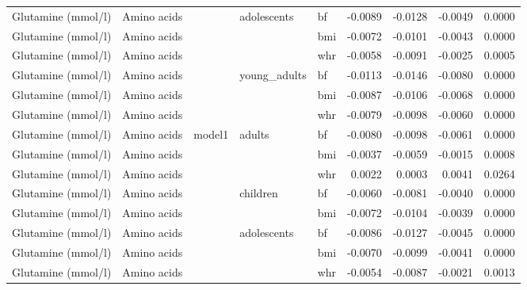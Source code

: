 \documentclass[11pt,twoside]{bristolthesis}
\begin{document}
\begin{longtable}[t]{lllllrrrr}
\cmidrule{1-2}
\cmidrule{5-9}\nopagebreak
Glutamine (mmol/l) & Amino acids &  & \multirow{-2}{*}{\raggedright\arraybackslash adolescents} & bf & -0.0089 & -0.0128 & -0.0049 & 0.0000\\
\cmidrule{1-2}
\cmidrule{4-9}\nopagebreak
Glutamine (mmol/l) & Amino acids &  &  & bmi & -0.0072 & -0.0101 & -0.0043 & 0.0000\\
\cmidrule{1-2}
\cmidrule{5-9}\nopagebreak
Glutamine (mmol/l) & Amino acids &  &  & whr & -0.0058 & -0.0091 & -0.0025 & 0.0005\\
\cmidrule{1-2}
\cmidrule{5-9}\nopagebreak
Glutamine (mmol/l) & Amino acids &  & \multirow{-3}{*}{\raggedright\arraybackslash young\_adults} & bf & -0.0113 & -0.0146 & -0.0080 & 0.0000\\
\cmidrule{1-2}
\cmidrule{4-9}\nopagebreak
Glutamine (mmol/l) & Amino acids &  &  & bmi & -0.0087 & -0.0106 & -0.0068 & 0.0000\\
\cmidrule{1-2}
\cmidrule{5-9}\nopagebreak
Glutamine (mmol/l) & Amino acids &  &  & whr & -0.0079 & -0.0098 & -0.0060 & 0.0000\\
\cmidrule{1-2}
\cmidrule{5-9}\nopagebreak
Glutamine (mmol/l) & Amino acids & \multirow{-11}{*}{\raggedright\arraybackslash model1} & \multirow{-3}{*}{\raggedright\arraybackslash adults} & bf & -0.0080 & -0.0098 & -0.0061 & 0.0000\\
\cmidrule{1-9}\pagebreak[0]
Glutamine (mmol/l) & Amino acids &  &  & bmi & -0.0037 & -0.0059 & -0.0015 & 0.0008\\
\cmidrule{1-2}
\cmidrule{5-9}\nopagebreak
Glutamine (mmol/l) & Amino acids &  &  & whr & 0.0022 & 0.0003 & 0.0041 & 0.0264\\
\cmidrule{1-2}
\cmidrule{5-9}\nopagebreak
Glutamine (mmol/l) & Amino acids &  & \multirow{-3}{*}{\raggedright\arraybackslash children} & bf & -0.0060 & -0.0081 & -0.0040 & 0.0000\\
\cmidrule{1-2}
\cmidrule{4-9}\nopagebreak
Glutamine (mmol/l) & Amino acids &  &  & bmi & -0.0072 & -0.0104 & -0.0039 & 0.0000\\
\cmidrule{1-2}
\cmidrule{5-9}\nopagebreak
Glutamine (mmol/l) & Amino acids &  & \multirow{-2}{*}{\raggedright\arraybackslash adolescents} & bf & -0.0086 & -0.0127 & -0.0045 & 0.0000\\
\cmidrule{1-2}
\cmidrule{4-9}\nopagebreak
Glutamine (mmol/l) & Amino acids &  &  & bmi & -0.0070 & -0.0099 & -0.0041 & 0.0000\\
\cmidrule{1-2}
\cmidrule{5-9}\nopagebreak
Glutamine (mmol/l) & Amino acids &  &  & whr & -0.0054 & -0.0087 & -0.0021 & 0.0013\\

\end{longtable}
\end{document}
